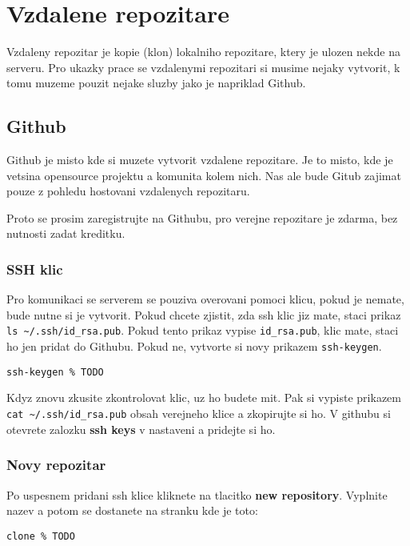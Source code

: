 \documentclass[12pt,a5paper]{article}
\begin{document}
\section{Vzdalene repozitare}

Vzdaleny repozitar je kopie (klon) lokalniho repozitare, ktery je ulozen nekde na serveru. Pro ukazky prace se vzdalenymi repozitari si musime nejaky vytvorit, k tomu muzeme pouzit nejake sluzby jako je napriklad Github.

\subsection{Github}

Github je misto kde si muzete vytvorit vzdalene repozitare. Je to misto, kde je vetsina opensource projektu a komunita kolem nich. Nas ale bude Gitub zajimat pouze z pohledu hostovani vzdalenych repozitaru.

Proto se prosim zaregistrujte na Githubu, pro verejne repozitare je zdarma, bez nutnosti zadat kreditku.

\subsubsection{SSH klic}

Pro komunikaci se serverem se pouziva overovani pomoci klicu, pokud je nemate, bude nutne si je vytvorit. Pokud chcete zjistit, zda ssh klic jiz mate, staci prikaz \lstinline|ls ~/.ssh/id_rsa.pub|. Pokud tento prikaz vypise \lstinline|id_rsa.pub|, klic mate, staci ho jen pridat do Githubu. Pokud ne, vytvorte si novy prikazem \lstinline|ssh-keygen|.

\begin{lstlisting}
ssh-keygen % TODO
\end{lstlisting}

Kdyz znovu zkusite zkontrolovat klic, uz ho budete mit. Pak si vypiste prikazem \lstinline|cat ~/.ssh/id_rsa.pub| obsah verejneho klice a zkopirujte si ho. V githubu si otevrete zalozku {\bf ssh keys} v nastaveni a pridejte si ho.

\subsubsection{Novy repozitar}

Po uspesnem pridani ssh klice kliknete na tlacitko {\bf new repository}. Vyplnite nazev a potom se dostanete na stranku kde je toto:


\begin{lstlisting}
clone % TODO
\end{lstlisting}
\end{document}
